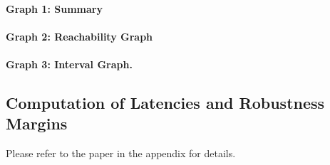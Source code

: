\paragraph{Graph 1: Summary}

\paragraph{Graph 2: Reachability Graph}

\paragraph{Graph 3: Interval Graph.}

\bigskip

\subsection{Computation of Latencies and Robustness Margins}
\label{sec:analysis}

Please refer to the paper in the appendix for details.
